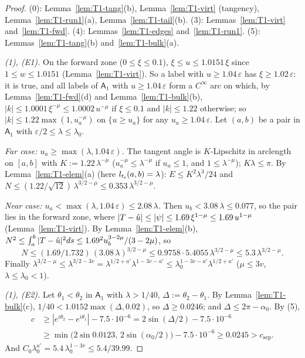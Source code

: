 \begin{proof}
(0): Lemma~\ref{lem:T1-tang}(b), Lemma~\ref{lem:T1-virt} (tangency), Lemma~\ref{lem:T1-run1}(a), Lemma~\ref{lem:T1-tail}(b).
(3): Lemmas~\ref{lem:T1-virt} and~\ref{lem:T1-fwd}. (4): Lemmas~\ref{lem:T1-edges} and~\ref{lem:T1-run1}. (5):
Lemmas~\ref{lem:T1-tang}(b) and~\ref{lem:T1-bulk}(a).

\emph{(1), \textup{(E1)}.} On the forward zone ($0\le\xi\le0.1$), $\xi\le u\le1.0151\,\xi$ since $1\le w\le1.0151$
(Lemma~\ref{lem:T1-virt}). So a label with $u\ge1.04\,\varepsilon$ has $\xi\ge1.02\,\varepsilon$: it is true, and all labels of
$\mathsf A_1$ with $u\ge1.04\,\varepsilon$ form a $C^\infty$ arc on which, by Lemma~\ref{lem:T1-fwd}(d) and Lemma~\ref{lem:T1-bulk}(b),
$|k|\le1.0001\,\xi^{-\mu}\le1.0002\,u^{-\mu}$ if $\xi\le0.1$ and $|k|\le1.22$ otherwise; so $|k|\le1.22\max(1,u_a^{-\mu})$ on
$\{u\ge u_a\}$ for any $u_a\ge1.04\,\varepsilon$. Let $(a,b)$ be a pair in $\mathsf A_1$ with $\varepsilon/2\le\lambda\le\lambda_0$.

\emph{Far case: $u_a\ge\max(\lambda,1.04\,\varepsilon)$.} The tangent angle is $K$-Lipschitz in arclength on $[a,b]$ with
$K:=1.22\,\lambda^{-\mu}$ ($u_a^{-\mu}\le\lambda^{-\mu}$ if $u_a\le1$, and $1\le\lambda^{-\mu}$); $K\lambda\le\pi$. By
Lemma~\ref{lem:T1-elem}(a) (here $l_{t_{\mathrm s}}(a,b)=\lambda$): $E\le K^2\lambda^3/24$ and
$N\le(1.22/\sqrt{12})\,\lambda^{3/2-\mu}\le0.353\,\lambda^{3/2-\mu}$.

\emph{Near case: $u_a<\max(\lambda,1.04\,\varepsilon)\le2.08\,\lambda$.} Then $u_b<3.08\,\lambda\le0.077$, so the pair lies in the
forward zone, where $|T-\hat u|\le|\psi|\le1.69\,\xi^{1-\mu}\le1.69\,u^{1-\mu}$ (Lemma~\ref{lem:T1-virt}). By Lemma~\ref{lem:T1-elem}(b),
$N^2\le\int_a^b|T-\hat u|^2ds\le1.69^2u_b^{3-2\mu}/(3-2\mu)$, so
\[
N\le(1.69/1.732)\,(3.08\,\lambda)^{3/2-\mu}\le0.9758\cdot5.4055\,\lambda^{3/2-\mu}\le5.3\,\lambda^{3/2-\mu}.
\]
Finally $\lambda^{3/2-\mu}\le\lambda^{3/2-3v}=\lambda^{1/2+a'}\lambda^{1-3v-a'}\le\lambda_0^{1-3v-a'}\lambda^{1/2+a'}$ ($\mu\le3v$,
$\lambda\le\lambda_0<1$).

\emph{(1), \textup{(E2)}.} Let $\theta_1<\theta_2$ in $\mathsf A_1$ with $\lambda>1/40$, $\Delta:=\theta_2-\theta_1$. By
Lemma~\ref{lem:T1-bulk}(c), $1/40<1.0152\max(\Delta,0.02)$, so $\Delta\ge0.0246$; and $\Delta\le2\pi-\alpha_0$. By (5),
\begin{align*}
c&\ge|e^{i\theta_2}-e^{i\theta_1}|-7.5\cdot10^{-6}=2\sin(\Delta/2)-7.5\cdot10^{-6}\\
&\ge\min\bigl(2\sin0.0123,\,2\sin(\alpha_0/2)\bigr)-7.5\cdot10^{-6}\ge0.0245>c_{\mathrm{sep}} .
\end{align*}
And $C_0\lambda_0^{a'}=5.4\,\lambda_0^{1-3v}\le5.4/39.99$.


\end{proof}

